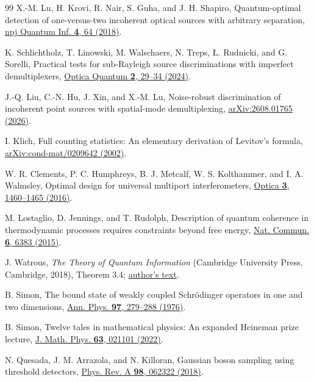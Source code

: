 \documentclass[aps,pra,reprint,superscriptaddress,longbibliography]{revtex4-2}
\begin{document}
\begin{thebibliography}{99}
X.-M. Lu, H. Krovi, R. Nair, S. Guha, and J. H. Shapiro,
Quantum-optimal detection of one-versus-two incoherent optical sources
with arbitrary separation,
\href{https://doi.org/10.1038/s41534-018-0114-y}
{npj Quantum Inf. \textbf{4}, 64 (2018)}.

K. Schlichtholz, T. Linowski, M. Walschaers, N. Treps,
\L{}. Rudnicki, and G. Sorelli,
Practical tests for sub-Rayleigh source discriminations with imperfect
demultiplexers,
\href{https://doi.org/10.1364/OPTICAQ.502459}
{Optica Quantum \textbf{2}, 29--34 (2024)}.

J.-Q. Liu, C.-N. Hu, J. Xin, and X.-M. Lu,
Noise-robust discrimination of incoherent point sources with
spatial-mode demultiplexing,
\href{https://arxiv.org/abs/2608.01765}
{arXiv:2608.01765 (2026)}.

I. Klich,
Full counting statistics: An elementary derivation of Levitov's formula,
\href{https://arxiv.org/abs/cond-mat/0209642}{arXiv:cond-mat/0209642 (2002)}.

W. R. Clements, P. C. Humphreys, B. J. Metcalf,
W. S. Kolthammer, and I. A. Walmsley,
Optimal design for universal multiport interferometers,
\href{https://doi.org/10.1364/OPTICA.3.001460}
{Optica \textbf{3}, 1460--1465 (2016)}.

M. Lostaglio, D. Jennings, and T. Rudolph,
Description of quantum coherence in thermodynamic processes requires
constraints beyond free energy,
\href{https://doi.org/10.1038/ncomms7383}
{Nat. Commun. \textbf{6}, 6383 (2015)}.

J. Watrous,
\emph{The Theory of Quantum Information}
(Cambridge University Press, Cambridge, 2018), Theorem 3.4;
\href{https://cs.uwaterloo.ca/~watrous/TQI/TQI.pdf}{author's text}.

B. Simon,
The bound state of weakly coupled Schr\"odinger operators in one and
two dimensions,
\href{https://doi.org/10.1016/0003-4916(76)90038-5}
{Ann. Phys. \textbf{97}, 279--288 (1976)}.

B. Simon,
Twelve tales in mathematical physics: An expanded Heineman prize lecture,
\href{https://doi.org/10.1063/5.0056008}
{J. Math. Phys. \textbf{63}, 021101 (2022)}.

N. Quesada, J. M. Arrazola, and N. Killoran,
Gaussian boson sampling using threshold detectors,
\href{https://doi.org/10.1103/PhysRevA.98.062322}
{Phys. Rev. A \textbf{98}, 062322 (2018)}.


\end{thebibliography}
\end{document}
